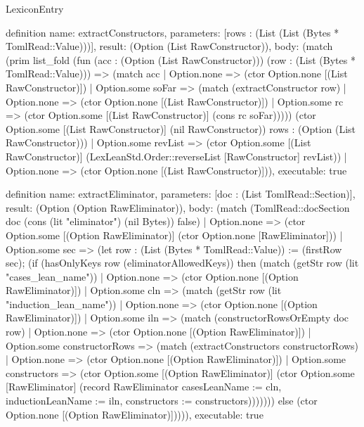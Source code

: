 \begin{lexlean}{LexiconEntry}
\begin{semanticmodule}
definition{
  name: extractConstructors,
  parameters: [rows : (List (List (Bytes * TomlRead::Value)))],
  result: (Option (List RawConstructor)),
  body: (match (prim list_fold (fun (acc : (Option (List RawConstructor))) (row : (List (Bytes * TomlRead::Value))) => (match acc
      | Option.none => (ctor Option.none [(List RawConstructor)])
      | Option.some soFar => (match (extractConstructor row)
        | Option.none => (ctor Option.none [(List RawConstructor)])
        | Option.some rc => (ctor Option.some [(List RawConstructor)] (cons rc soFar))))) (ctor Option.some [(List RawConstructor)] (nil RawConstructor)) rows : (Option (List RawConstructor)))
    | Option.some revList => (ctor Option.some [(List RawConstructor)] (LexLeanStd.Order::reverseList [RawConstructor] revList))
    | Option.none => (ctor Option.none [(List RawConstructor)])),
  executable: true
}

definition{
  name: extractEliminator,
  parameters: [doc : (List TomlRead::Section)],
  result: (Option (Option RawEliminator)),
  body: (match (TomlRead::docSection doc (cons (lit "eliminator") (nil Bytes)) false)
    | Option.none => (ctor Option.some [(Option RawEliminator)] (ctor Option.none [RawEliminator]))
    | Option.some sec => (let row : (List (Bytes * TomlRead::Value)) := (firstRow sec); (if (hasOnlyKeys row (eliminatorAllowedKeys)) then (match (getStr row (lit "cases_lean_name"))
      | Option.none => (ctor Option.none [(Option RawEliminator)])
      | Option.some cln => (match (getStr row (lit "induction_lean_name"))
        | Option.none => (ctor Option.none [(Option RawEliminator)])
        | Option.some iln => (match (constructorRowsOrEmpty doc row)
          | Option.none => (ctor Option.none [(Option RawEliminator)])
          | Option.some constructorRows => (match (extractConstructors constructorRows)
            | Option.none => (ctor Option.none [(Option RawEliminator)])
            | Option.some constructors => (ctor Option.some [(Option RawEliminator)] (ctor Option.some [RawEliminator] (record RawEliminator {casesLeanName := cln, inductionLeanName := iln, constructors := constructors}))))))) else (ctor Option.none [(Option RawEliminator)])))),
  executable: true
}


\end{semanticmodule}
\end{lexlean}
